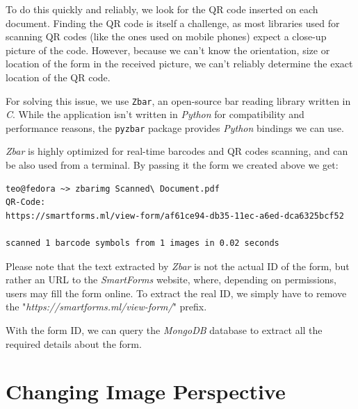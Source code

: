 \documentclass[12pt, a4paper]{report}
\def\code#1{\texttt{#1}}
\begin{document}
To do this quickly and reliably, we look for the QR code inserted on each document. Finding the QR code is itself a challenge, as most libraries used for scanning QR codes (like the ones used on mobile phones) expect a close-up picture of the code. However, because we can't know the orientation, size or location of the form in the received picture, we can't reliably determine the exact location of the QR code.

For solving this issue, we use \code{Zbar}, an open-source bar reading library written in \textit{C}. While the application isn't written in \textit{Python} for compatibility and performance reasons, the \code{pyzbar} package provides \textit{Python} bindings we can use.

\textit{Zbar} is highly optimized for real-time barcodes and QR codes scanning, and can be also used from a terminal. By passing it the form we created above we get:


\begin{verbatim}
teo@fedora ~> zbarimg Scanned\ Document.pdf 
QR-Code:
https://smartforms.ml/view-form/af61ce94-db35-11ec-a6ed-dca6325bcf52

scanned 1 barcode symbols from 1 images in 0.02 seconds
\end{verbatim}

Please note that the text extracted by \textit{Zbar} is not the actual ID of the form, but rather an URL to the \textit{SmartForms} website, where, depending on permissions, users may fill the form online. To extract the real ID, we simply have to remove the "\textit{https://smartforms.ml/view-form/}" prefix.

With the form ID, we can query the \textit{MongoDB} database to extract all the required details about the form.

\section{Changing Image Perspective}
\end{document}
